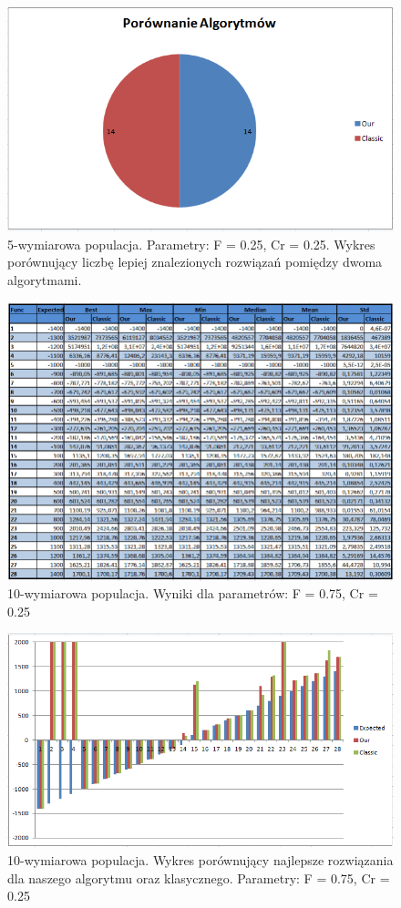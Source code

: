 \documentclass[a4paper]{article}
\begin{document}
\begin{figure}[!h]
\centering
\includegraphics[width=\textwidth]{F5Cr25L10statystyka.png}
\caption{5-wymiarowa populacja. Parametry: F = 0.25, Cr = 0.25. Wykres porównujący liczbę lepiej znalezionych rozwiązań pomiędzy dwoma algorytmami.}
\end{figure}

\begin{figure}[!h]
\centering
\includegraphics[width=\textwidth]{F75Cr25L10tab.png}
\caption{10-wymiarowa populacja. Wyniki dla parametrów: F = 0.75, Cr = 0.25}
\end{figure}

\begin{figure}[!h]
\centering
\includegraphics[width=\textwidth]{F75Cr25L10chart.png}
\caption{10-wymiarowa populacja. Wykres porównujący najlepsze rozwiązania dla naszego algorytmu oraz klasycznego. Parametry: F = 0.75, Cr = 0.25}
\end{figure}
\end{document}

